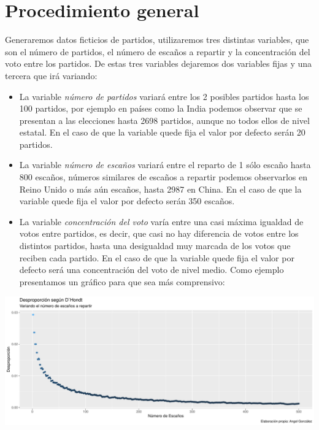 \documentclass[12pt,a4paper,]{book}
\numberwithin{dummy}{section}
\theoremstyle{ocrenumbox}
\theoremstyle{blacknumex}
\theoremstyle{blacknumbox}
\theoremstyle{ocrenum}
\theoremstyle{ocrenum}
\begin{document}
\hypertarget{procedimiento-general}{%
\section{Procedimiento general}\label{procedimiento-general}}

Generaremos datos ficticios de partidos, utilizaremos tres distintas
variables, que son el número de partidos, el número de escaños a
repartir y la concentración del voto entre los partidos. De estas tres
variables dejaremos dos variables fijas y una tercera que irá variando:

\begin{itemize}
\item
  La variable \emph{número de partidos} variará entre los 2 posibles
  partidos hasta los 100 partidos, por ejemplo en países como la India
  podemos observar que se presentan a las elecciones hasta 2698
  partidos, aunque no todos ellos de nivel estatal. En el caso de que la
  variable quede fija el valor por defecto serán 20 partidos.
\item
  La variable \emph{número de escaños} variará entre el reparto de 1
  sólo escaño hasta 800 escaños, números similares de escaños a repartir
  podemos observarlos en Reino Unido o más aún escaños, hasta 2987 en
  China. En el caso de que la variable quede fija el valor por defecto
  serán 350 escaños.
\item
  La variable \emph{concentración del voto} varía entre una casi máxima
  igualdad de votos entre partidos, es decir, que casi no hay diferencia
  de votos entre los distintos partidos, hasta una desigualdad muy
  marcada de los votos que reciben cada partido. En el caso de que la
  variable quede fija el valor por defecto será una concentración del
  voto de nivel medio. Como ejemplo presentamos un gráfico para que sea
  más comprensivo:
\end{itemize}

\begin{center}\includegraphics[width=0.95\linewidth]{figurasR/unnamed-chunk-9-1} \end{center}
\end{document}

